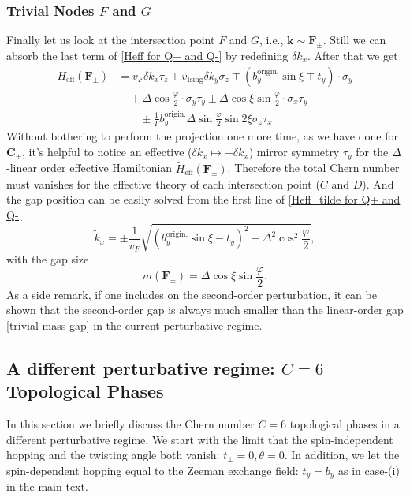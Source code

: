 \begin{subappendices}
		\subsubsection{Trivial Nodes $F$ and $G$}
			Finally let us look at the intersection point $F$ and $G$, i.e., $\bm{k}\sim\bm{F}_\pm$. Still we can absorb the last term of \eqref{Heff for Q+ and Q-} by redefining $\delta k_x$. After that we get
			\begin{align}\label{Heff_tilde for Q+ and Q-}
				\widetilde H_{\text{eff}}(\bm{F}_\pm)&=v_F\delta \tilde k_x \tau_z+v_{\text{Ising}}\delta k_y \sigma_z\mp (b_y^{\text{origin.}}\sin\xi\mp t_y)\cdot\sigma_y\nonumber\\
				&\quad+\Delta\cos\frac{\varphi}{2}\cdot\sigma_y\tau_y\pm\Delta\cos\xi\sin\frac{\varphi}{2}\cdot\sigma_x\tau_y\nonumber\\
				&\quad\quad\pm\frac{1}{\Gamma}b_y^{\text{origin.}}\Delta\sin\frac{\varphi}{2}\sin 2\xi\sigma_z\tau_x
			\end{align}
			Without bothering to perform the projection one more time, as we have done for $\bm{C}_\pm$, it's helpful to notice an effective ($\delta k_x\mapsto -\delta k_x$) mirror symmetry $\tau_y$ for the $\Delta$-linear order effective Hamiltonian $\widetilde H_{\text{eff}}(\bm{F}_\pm)$. Therefore the total Chern number must vanishes for the effective theory of each intersection point ($C$ and $D$). And the gap position can be easily solved from the first line of \eqref{Heff_tilde for Q+ and Q-}
			\begin{equation*}
				\tilde k_x=\pm\dfrac{1}{v_F}\sqrt{(b_y^{\text{origin.}}\sin\xi-t_y)^2-\Delta^2\cos^2\frac{\varphi}{2}},
			\end{equation*}
			with the gap size
			\begin{equation}\label{trivial mass gap}
				m(\bm{F}_\pm)=\Delta\cos\xi\sin\frac{\varphi}{2}.
			\end{equation}
			As a side remark, if one includes on the second-order perturbation, it can be shown that the second-order gap is always much smaller than the linear-order gap \eqref{trivial mass gap} in the current perturbative regime.

	\subsection{A different perturbative regime: $C=6$ Topological Phases}
	    In this section we briefly discuss the Chern number $C=6$ topological phases in a different perturbative regime. We start with the limit that the spin-independent hopping and the twisting angle both vanish: $t_\perp=0,\theta=0$. In addition, we let the spin-dependent hopping equal to the Zeeman exchange field: $t_y=b_y$ as in case-(i) in the main text.  
	    

\end{subappendices}
